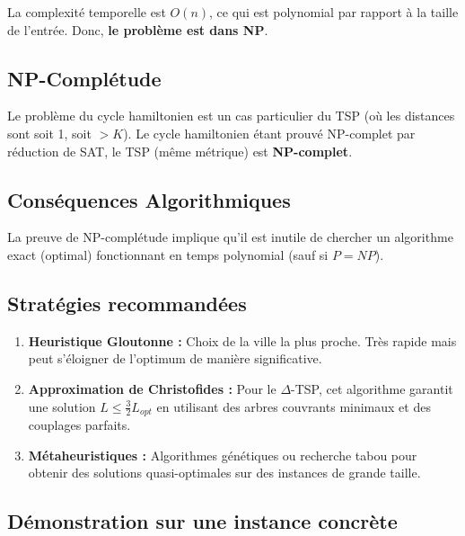 \vspace{0.5cm}

\noindent La complexité temporelle est $O(n)$, ce qui est polynomial par rapport à la taille de l'entrée. Donc, \textbf{le problème est dans NP}.

\subsection*{NP-Complétude}
{}

\noindent Le problème du cycle hamiltonien est un cas particulier du TSP (où les distances sont soit 1, soit $> K$). Le cycle hamiltonien étant prouvé NP-complet par réduction de SAT, le TSP (même métrique) est \textbf{NP-complet}. 

\subsection*{Conséquences Algorithmiques}
{}

\noindent La preuve de NP-complétude implique qu'il est inutile de chercher un algorithme exact (optimal) fonctionnant en temps polynomial (sauf si $P=NP$).

\subsection*{Stratégies recommandées}
{}

\begin{enumerate}
    \item \textbf{Heuristique Gloutonne :} Choix de la ville la plus proche. Très rapide mais peut s'éloigner de l'optimum de manière significative.
    \item \textbf{Approximation de Christofides :} Pour le $\Delta$-TSP, cet algorithme garantit une solution $L \le \frac{3}{2} L_{opt}$ en utilisant des arbres couvrants minimaux et des couplages parfaits.
    \item \textbf{Métaheuristiques :} Algorithmes génétiques ou recherche tabou pour obtenir des solutions quasi-optimales sur des instances de grande taille.
\end{enumerate}

\subsection*{Démonstration sur une instance concrète}
{}


